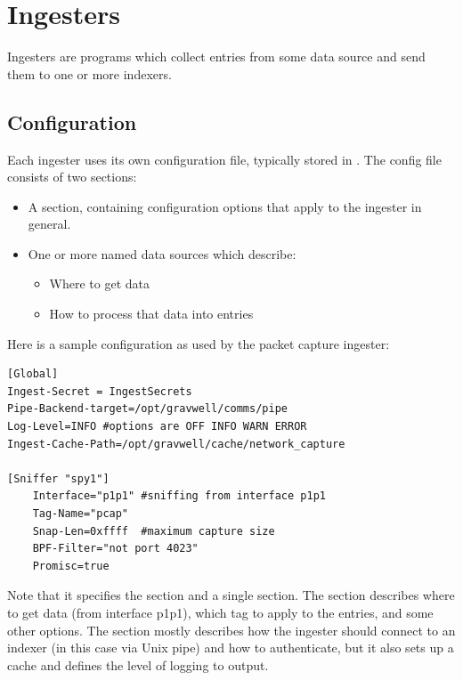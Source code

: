 \chapter{Ingesters}
Ingesters are programs which collect entries from some data source and
send them to one or more indexers.

\section{Configuration}
\label{sec:global-config}

Each ingester uses its own configuration file, typically stored in
. The config file consists of two sections:

\begin{itemize}
\item
  A \code{[Global]} section, containing configuration options that
  apply to the ingester in general.
\item
  One or more named data sources which describe:
	\begin{itemize}
	\item Where to get data
	\item How to process that data into entries
	\end{itemize}
\end{itemize}

Here is a sample configuration as used by the packet capture ingester:

\begin{Verbatim}[breaklines=true]
[Global]
Ingest-Secret = IngestSecrets
Pipe-Backend-target=/opt/gravwell/comms/pipe
Log-Level=INFO #options are OFF INFO WARN ERROR
Ingest-Cache-Path=/opt/gravwell/cache/network_capture

[Sniffer "spy1"]
    Interface="p1p1" #sniffing from interface p1p1
    Tag-Name="pcap"
    Snap-Len=0xffff  #maximum capture size
    BPF-Filter="not port 4023"
    Promisc=true
\end{Verbatim}

Note that it specifies the \code{[Global]} section and a single
\code{[Sniffer]} section. The \code{[Sniffer]} section describes where to get
data (from interface p1p1), which tag to apply to the entries, and some
other options. The \code{[Global]} section mostly describes how the
ingester should connect to an indexer (in this case via Unix pipe) and
how to authenticate, but it also sets up a cache and defines the level
of logging to output.

